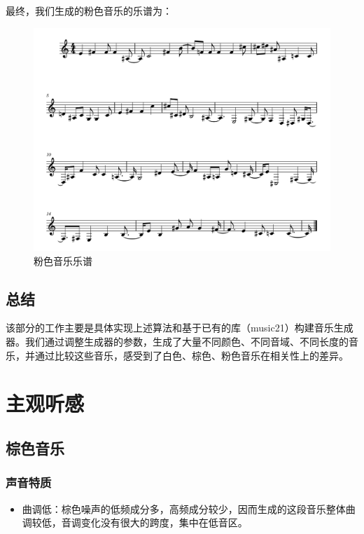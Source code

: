 \documentclass[a4paper,12pt]{article} %
\begin{document}
最终，我们生成的粉色音乐的乐谱为：
\begin{figure}[H]
    \centering
    \includegraphics[width=1.0\linewidth]{images/pink.png}
    \caption{粉色音乐乐谱}
    \label{fig:enter-label}
\end{figure}

\subsection{总结}
该部分的工作主要是具体实现上述算法和基于已有的库（music21）构建音乐生成器。我们通过调整生成器的参数，生成了大量不同颜色、不同音域、不同长度的音乐，并通过比较这些音乐，感受到了白色、棕色、粉色音乐在相关性上的差异。

\section{主观听感}
\subsection{棕色音乐}

\subsubsection{声音特质}
\begin{itemize}
    \item 曲调低：棕色噪声的低频成分多，高频成分较少，因而生成的这段音乐整体曲调较低，音调变化没有很大的跨度，集中在低音区。
\end{itemize}
\end{document}
